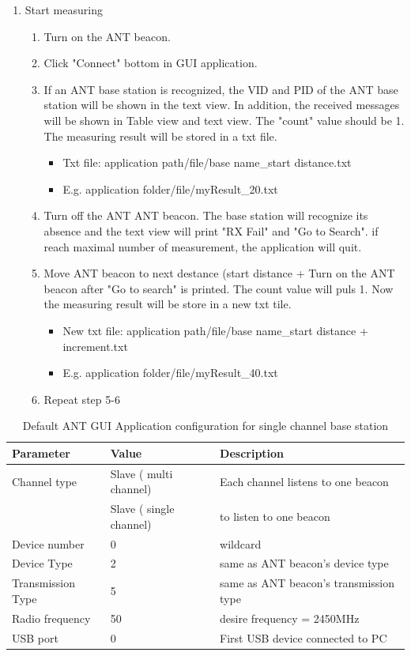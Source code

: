 \documentclass{article}
\begin{document}
\begin{enumerate}
\item Start  measuring
	\begin{enumerate}
	\item Turn on the ANT beacon.
	\item Click "Connect" bottom in GUI application.
	\item If an ANT base station is recognized, the VID and PID of the ANT base station will be shown in the text view. In addition, the received messages will be shown in Table view and text view. The "count"  value should be 1.  The measuring result will be stored in a txt file. 
		\begin{itemize}
		\item Txt file:  application path/file/base name\_start distance.txt
		\item E.g. application folder/file/myResult\_20.txt
		\end{itemize}
		
	\item Turn off the ANT ANT beacon. The base station will recognize its absence and the text view will print "RX Fail" and "Go to Search". if reach maximal number of measurement, the application will quit.  
	\item Move ANT beacon to next destance (start distance + Turn on the ANT beacon after "Go to search" is printed. The count value will puls 1. Now the measuring result will be store in a new txt tile. 
		\begin{itemize}
		\item New txt file: application path/file/base name\_start distance + increment.txt  
		\item E.g. application folder/file/myResult\_40.txt
		\end{itemize}
	\item Repeat step 5-6
	\end{enumerate}
\end{enumerate}

\begin{table}[!h]
\begin{center}
\caption{Default ANT GUI Application configuration for single channel base station}
\label{Default_ANT_GUI_config}
\begin{tabular}{|l|l|l|}
\hline
Parameter    & Value     & Description \\
\hline
Channel type  &  Slave ( multi channel)       & Each channel listens to  one beacon \\
\hline
 & Slave ( single channel) & to listen to one beacon \\
\hline
Device number  &  0  &  wildcard \\
\hline
Device Type    & 2 &  same as ANT beacon's device type \\
\hline
Transmission Type &  5 &  same as ANT beacon's transmission type \\ 
\hline
Radio frequency & 50 & desire frequency = 2450MHz \\
\hline
USB port & 0 & First USB device connected to PC \\
\hline
\end{tabular}
\end{center}
\end{table}
\end{document}
